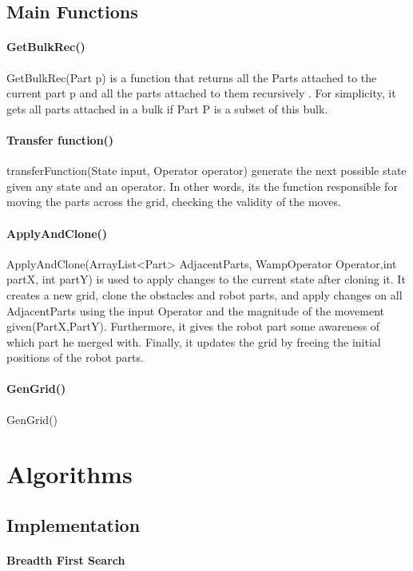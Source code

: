 \section{Main Functions}
\subsubsection{GetBulkRec()}
GetBulkRec(Part p) is a function that returns all the Parts attached to the current part p and all the parts attached to them recursively . For simplicity, it gets all parts attached in a bulk if Part P is a subset of this bulk. 



\subsubsection{Transfer function()}
transferFunction(State input, Operator operator) generate the next possible state given any state and an operator. In other words, its the function responsible for moving the parts across the grid, checking the validity of the moves. 

\subsubsection{ApplyAndClone()}
ApplyAndClone(ArrayList<Part> AdjacentParts, WampOperator Operator,int partX, int partY) is used to apply changes to the current state after cloning it. It creates a new grid, clone the obstacles and robot parts, and apply changes on all AdjacentParts using the input Operator and the magnitude of the movement given(PartX,PartY). Furthermore, it gives the robot part some awareness of which part he merged with. Finally, it updates the grid by freeing the initial positions of the robot parts.

\subsubsection{GenGrid()}
GenGrid() 


\chapter{Algorithms}
\section{Implementation}
\subsubsection{Breadth First Search}

